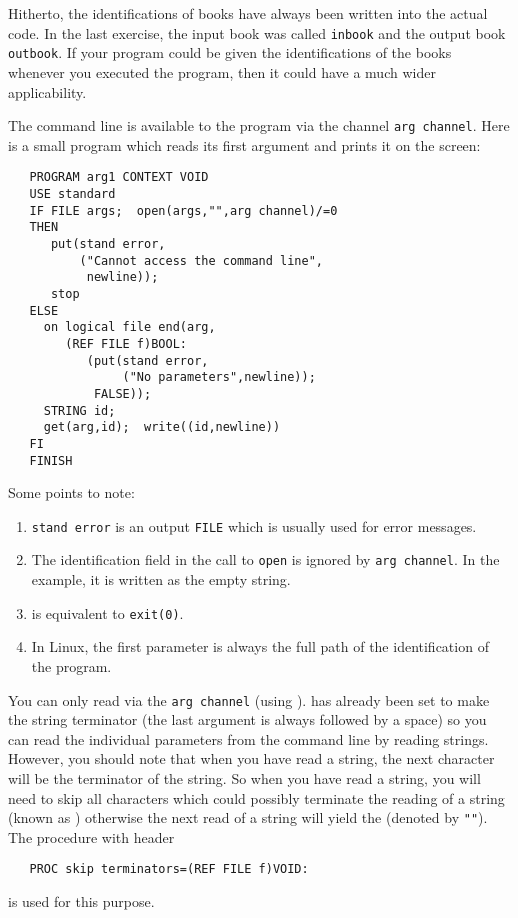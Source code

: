 Hitherto, the identifications of books have always been written into
the actual code. In the last exercise, the input book was called
\verb|inbook| and the output book \verb|outbook|. If your program
could be given the identifications of the books whenever you executed
the program, then it could have a much wider applicability.

The command line is available to the program via the channel
\verb|arg channel|. Here is a small program which reads its first
argument and prints it on the screen:
\begin{verbatim}
   PROGRAM arg1 CONTEXT VOID
   USE standard
   IF FILE args;  open(args,"",arg channel)/=0
   THEN
      put(stand error,
          ("Cannot access the command line",
           newline));
      stop
   ELSE
     on logical file end(arg,
        (REF FILE f)BOOL:
           (put(stand error,
                ("No parameters",newline));
            FALSE));
     STRING id;
     get(arg,id);  write((id,newline))
   FI
   FINISH
\end{verbatim}
\noindent
Some points to note:
\begin{enumerate}
\item \verb|stand error| is an output \verb|FILE| which is usually used
for error messages.
\item The identification field in the call to \verb|open| is ignored
by \verb|arg channel|. In the example, it is written as the empty
string.
\item {} is equivalent to \verb|exit(0)|.
\item In Linux, the first parameter is always the full path of the
identification of the program.
\end{enumerate}
You can only read via the \verb|arg channel| (using ).
 has already been set to make the string terminator
 (the last argument is always followed by a space) so you
can read the individual parameters from the command line by reading
strings.  However, you should note that when you have read a string,
the next character will be the terminator of the string. So when you
have read a string, you will need to skip all characters which could
possibly terminate the reading of a string (known as
) otherwise the next read of a string
will yield the  (denoted by \verb|""|).
The procedure  with header
\begin{verbatim}
   PROC skip terminators=(REF FILE f)VOID:
\end{verbatim}
\noindent
is used for this purpose.

